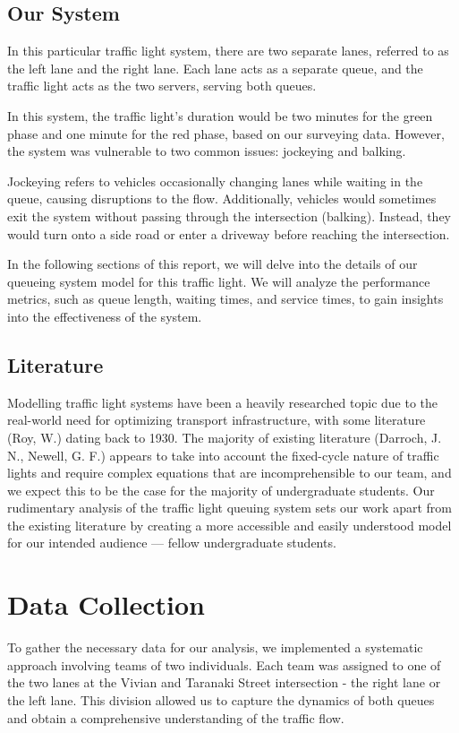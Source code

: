\documentclass[12pt, a4paper]{article}
\begin{document}
	\subsection{Our System}
	In this particular traffic light system, there are two separate lanes, referred to as the left lane and the right lane. Each lane acts as a separate queue, and the traffic light acts as the two servers, serving both queues.
	
	In this system, the traffic light's duration would be two minutes for the green phase and one minute for the red phase, based on our surveying data. However, the system was vulnerable to two common issues: jockeying and balking.
	
	Jockeying refers to vehicles occasionally changing lanes while waiting in the queue, causing disruptions to the flow. Additionally, vehicles would sometimes exit the system without passing through the intersection (balking). Instead, they would turn onto a side road or enter a driveway before reaching the intersection.
	
	In the following sections of this report, we will delve into the details of our queueing system model for this traffic light. We will analyze the performance metrics, such as queue length, waiting times, and service times, to gain insights into the effectiveness of the system. 
	
	\pagebreak
	\subsection{Literature}
	Modelling traffic light systems have been a heavily researched topic due to the real-world need for optimizing transport infrastructure, with some literature (Roy, W.) dating back to 1930. The majority of existing literature (Darroch, J. N., Newell, G. F.) appears to take into account the fixed-cycle nature of traffic lights and require complex equations that are incomprehensible to our team, and we expect this to be the case for the majority of undergraduate students. Our rudimentary analysis of the traffic light queuing system sets our work apart from the existing literature by creating a more accessible and easily understood model for our intended audience --- fellow undergraduate students. 
	
	\section{Data Collection}
	To gather the necessary data for our analysis, we implemented a systematic approach involving teams of two individuals. Each team was assigned to one of the two lanes at the Vivian and Taranaki Street intersection - the right lane or the left lane. This division allowed us to capture the dynamics of both queues and obtain a comprehensive understanding of the traffic flow.
	
\end{document}
